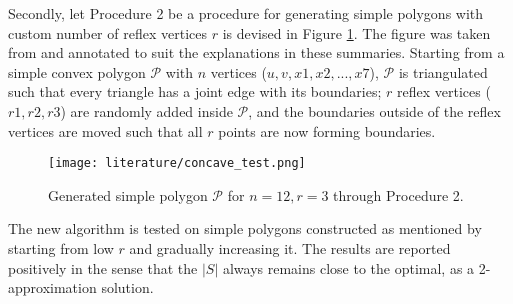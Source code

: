 Secondly, let Procedure 2 be a procedure for generating simple polygons with custom number of reflex vertices $r$ is devised in Figure \ref{fig:arbitrary}. The figure was taken from \cite{maleki2022implementation} and annotated to suit the explanations in these summaries. Starting from a simple convex polygon $\mathcal P$ with $n$ vertices ($u, v, x1, x2, ..., x7$), $\mathcal P$ is triangulated such that every triangle has a joint edge with its boundaries; $r$ reflex vertices ($r1, r2, r3$) are randomly added inside $\mathcal P$, and the boundaries outside of the reflex vertices are moved such that all $r$ points are now forming boundaries. 

\begin{figure}[h!]
    \centering
    \texttt{[image: literature/concave\_test.png]}
    \caption{Generated simple polygon $\mathcal P$ for $n = 12, r = 3$ \cite{maleki2022implementation} through Procedure 2.}
    \label{fig:arbitrary}
\end{figure}

The new algorithm is tested on simple polygons constructed as mentioned by starting from low $r$ and gradually increasing it. The results are reported positively in the sense that the $|S|$ always remains close to the optimal, as a 2-approximation solution.


